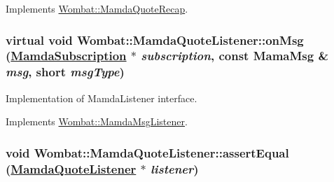 Implements \hyperlink{classWombat_1_1MamdaQuoteRecap_d36a516b29285e3f16b488fbe7e5ba1a}{Wombat::Mamda\-Quote\-Recap}.\hypertarget{classWombat_1_1MamdaQuoteListener_ecb41b49b757309bc1738e23d087bd25}{
\subsubsection[onMsg]{\setlength{\rightskip}{0pt plus 5cm}virtual void Wombat::Mamda\-Quote\-Listener::on\-Msg (\hyperlink{classWombat_1_1MamdaSubscription}{Mamda\-Subscription} $\ast$ {\em subscription}, const Mama\-Msg \& {\em msg}, short {\em msg\-Type})}}
\label{classWombat_1_1MamdaQuoteListener_ecb41b49b757309bc1738e23d087bd25}


Implementation of Mamda\-Listener interface. 



Implements \hyperlink{classWombat_1_1MamdaMsgListener_c700829ebcce095b95b8b67b39a1c67d}{Wombat::Mamda\-Msg\-Listener}.\hypertarget{classWombat_1_1MamdaQuoteListener_7d77206089991983a9fbaafc13be9cdf}{
\subsubsection[assertEqual]{\setlength{\rightskip}{0pt plus 5cm}void Wombat::Mamda\-Quote\-Listener::assert\-Equal (\hyperlink{classWombat_1_1MamdaQuoteListener}{Mamda\-Quote\-Listener} $\ast$ {\em listener})}}
\label{classWombat_1_1MamdaQuoteListener_7d77206089991983a9fbaafc13be9cdf}


